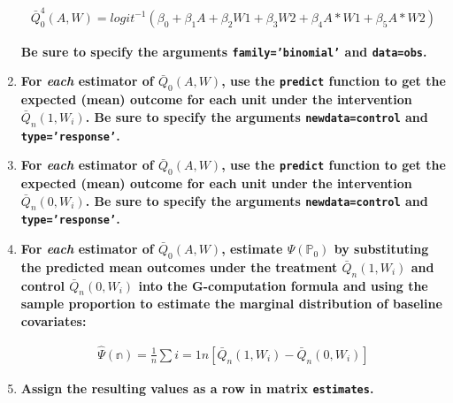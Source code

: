\documentclass{article}\usepackage[]{graphicx}\usepackage[]{xcolor}
\begin{document}
\begin{enumerate}[label=\textbf{\alph*.}]
\begin{align*}
\bar{Q}^4_0(A,W)=logit^{-1}(\beta_0+\beta_1A+\beta_2W1+\beta_3W2+\beta_4A*W1+\beta_5A*W2)
\end{align*}

\textbf{Be sure to specify the arguments \texttt{family='binomial'} and \texttt{data=obs}.}
    
    \item \textbf{For \textit{each} estimator of $\bar{Q}_0(A,W)$, use the \texttt{predict} function to get the expected (mean) outcome for each unit under the intervention $\bar{Q}_n(1,W_i)$. Be sure to specify the arguments \texttt{newdata=control} and \texttt{type='response'}.}
    
    \item \textbf{For \textit{each} estimator of $\bar{Q}_0(A,W)$, use the \texttt{predict} function to get the expected (mean) outcome for each unit under the intervention $\bar{Q}_n(0,W_i)$. Be sure to specify the arguments \texttt{newdata=control} and \texttt{type='response'}.}
    
    \item \textbf{For \textit{each} estimator of $\bar{Q}_0(A,W)$, estimate $\Psi(\mathbb{P}_0)$ by substituting the predicted mean outcomes under the treatment $\bar{Q}_n(1,W_i)$ and control $\bar{Q}_n(0,W_i)$ into the G-computation formula and using the sample proportion to estimate the marginal distribution of baseline covariates:}
    
\begin{align*}
\hat{\Psi}(\mathbb{n})=\frac{1}{n}\sum{i=1}{n}[\bar{Q}_n(1,W_i)-\bar{Q}_n(0,W_i)]
\end{align*}
    
    \item \textbf{Assign the resulting values as a row in matrix \texttt{estimates}.}
    
  \end{enumerate}
  
\end{document}
